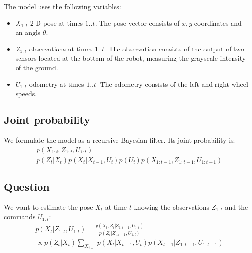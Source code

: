 \documentclass[letterpaper, 10pt, conference]{ieeeconf}
\begin{document}
The model uses the following variables:
\begin{itemize}
\item $X_{1:t}$ 2-D pose at times $1..t$.
The pose vector consists of $x,y$ coordinates and an angle $\theta$.
\item $Z_{1:t}$ observations at times $1..t$.
The observation consists of the output of two sensors located at the bottom of the robot, measuring the grayscale intensity of the ground.
\item $U_{1:t}$ odometry at times $1..t$.
The odometry consists of the left and right wheel speeds.
\end{itemize}

\subsection{Joint probability}

We formulate the model as a recursive Bayesian filter.
Its joint probability is:
\begin{equation*}
\begin{split}
& p(X_{1:t}, Z_{1:t}, U_{1:t}) = \\
& p(Z_t|X_t) p(X_t|X_{t-1}, U_{t}) p(U_t) p(X_{1:t-1}, Z_{1:t-1}, U_{1:t-1})
\end{split}
\end{equation*}

\subsection{Question}

We want to estimate the pose $X_t$ at time $t$ knowing the observations $Z_{1:t}$ and the commands $U_{1:t}$:
\begin{equation*}
\begin{split}
& p(X_t|Z_{1:t},U_{1:t}) = \frac{p(X_t,Z_t | Z_{1:t-1}, U_{1:t})}{p(Z_t|Z_{1:t-1}, U_{1:t})} \\
 &\propto p(Z_t | X_t) \sum_{X_{t-1}} p(X_t|X_{t-1}, U_t) p(X_{t-1} | Z_{1:t-1}, U_{1:t-1})
\end{split}
\end{equation*}
\end{document}
